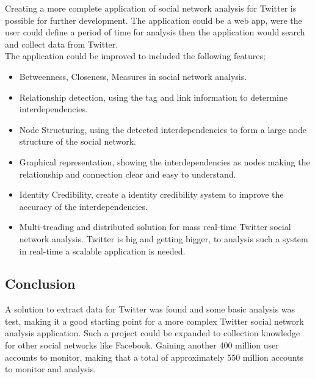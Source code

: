\documentclass[]{article}  %
\begin{document}
Creating a more complete application of social network analysis for Twitter is possible for further development. The application could be a web app, were the user could define a period of time for analysis then the application would search and collect data from Twitter. \\ The application could be improved to included the following features;

\begin{itemize}
	\item Betweenness, Closeness, Measures in social network analysis.
	\item Relationship detection, using the tag and link information to determine interdependencies.
	\item Node Structuring, using the detected interdependencies to form a large node structure of the social network.
	\item Graphical representation, showing the interdependencies as nodes making the relationship and connection clear and easy to understand.
	\item Identity Credibility, create a identity credibility system to improve the accuracy of the interdependencies.
	\item Multi-treading and distributed solution for mass real-time Twitter social network analysis. Twitter is big and getting bigger, to analysis such a system in real-time a scalable application is needed.
\end{itemize}

\subsection{Conclusion}

A solution to extract data for Twitter was found and some basic analysis was test, making it a good starting point for a more complex Twitter social network analysis application. Such a project could be expanded to collection knowledge for other social networks like Facebook. Gaining another 400 million user accounts to monitor, making that a total of approximately 550 million accounts to monitor and analysis.

\nocite{bib1} 
\nocite{bib2}
\nocite{bib3}
\nocite{bib4}
\nocite{bib5}
\nocite{bib6}
\nocite{bib7}
\nocite{bib8}
\nocite{bib9}
\nocite{bib10}
\nocite{bib11}
\nocite{bib12}
\nocite{bib13}




\end{document}
